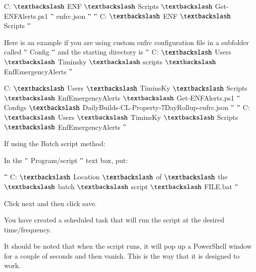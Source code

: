 \documentclass[a4paper,12pt]{report}
\begin{document}
{\fontsize{9pt}{9pt}\selectfont C: $  \textbackslash  $ ENF $  \textbackslash  $ Scripts $  \textbackslash  $ Get-ENFAlerts.ps1  $ " $ enfrc.json $ " $   $ " $ C: $  \textbackslash  $ ENF $  \textbackslash  $ Scripts $ " $ } \par
\begin{myEnumerate}
\item \begin{myEnumerate}
\item \begin{myEnumerate}
\item Here is an example if you are using custom enfrc configuration file in a subfolder called  $ " $ Config $ " $  and the starting directory is  $ " $ C: $  \textbackslash  $ Users $  \textbackslash  $ Timinsky $  \textbackslash  $ scripts $  \textbackslash  $ EnfEmergencyAlerts $ " $  \par
\end{myEnumerate}
\end{myEnumerate}
\end{myEnumerate}
{\fontsize{9pt}{9pt}\selectfont C: $  \textbackslash  $ Users $  \textbackslash  $ TiminsKy $  \textbackslash  $ Scripts $  \textbackslash  $ EnfEmergencyAlerts $  \textbackslash  $ Get-ENFAlerts.ps1  $ " $ Configs $  \textbackslash  $ DailyBuilds-CL-Property-7DayRollup-enfrc.json $ " $   $ " $ C: $  \textbackslash  $ Users $  \textbackslash  $ TiminsKy $  \textbackslash  $ Scripts $  \textbackslash  $ EnfEmergencyAlerts $ " $ } \par
\begin{myEnumerate}
\item If using the Batch script method: \par
\begin{myEnumerate}
\item In the  $ " $ Program/script $ " $  text box, put: \par
\end{myEnumerate}
\end{myEnumerate}
{\fontsize{9pt}{9pt}\selectfont  $ " $ C: $  \textbackslash  $ Location $  \textbackslash  $ of $  \textbackslash  $ the $  \textbackslash  $ batch $  \textbackslash  $ script $  \textbackslash  $ FILE.bat $ " $ } \par
\begin{myEnumerate}
\item Click next and then click save. \par
\item You have created a scheduled task that will run the script at the desired time/frequency.  \par
\end{myEnumerate}
It should be noted that when the script runs, it will pop up a PowerShell window for a couple of seconds and then vanish. This is the way that it is designed to work. \par
\end{document}
